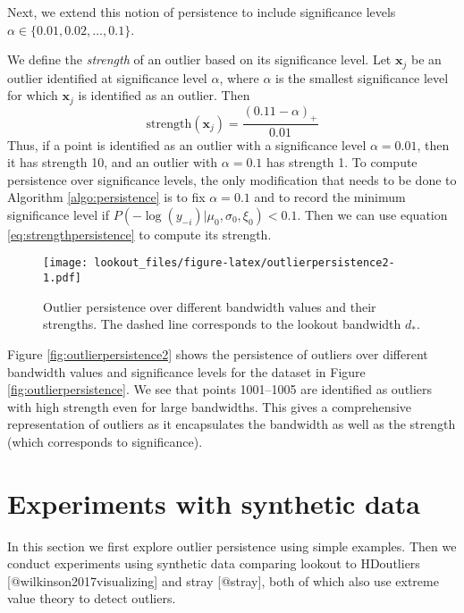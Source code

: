 \documentclass[
]{article}
\begin{document}
Next, we extend this notion of persistence to include significance
levels \(\alpha \in \{0.01, 0.02, \dots, 0.1 \}\).

We define the \emph{strength} of an outlier based on its significance
level. Let \(\bm{x}_j\) be an outlier identified at significance level
\(\alpha\), where \(\alpha\) is the smallest significance level for
which \(\bm{x}_j\) is identified as an outlier. Then
\begin{equation}\label{eq:strengthpersistence}
    \text{strength} (\bm{x}_j) = \frac{(0.11 - \alpha)_+}{0.01}
\end{equation} Thus, if a point is identified as an outlier with a
significance level \(\alpha = 0.01\), then it has strength 10, and an
outlier with \(\alpha = 0.1\) has strength 1. To compute persistence
over significance levels, the only modification that needs to be done to
Algorithm \ref{algo:persistence} is to fix \(\alpha = 0.1\) and to
record the minimum significance level if
\(P\left(-\log(y_{-i})|\mu_0, \sigma_0, \xi_0 \right) < 0.1\). Then we
can use equation \eqref{eq:strengthpersistence} to compute its strength.

\begin{figure}
\centering
\texttt{[image: lookout\_files/figure-latex/outlierpersistence2-1.pdf]}
\caption{Outlier persistence over different bandwidth values and their
strengths. The dashed line corresponds to the lookout bandwidth
\(d_*\).}
\end{figure}

Figure \ref{fig:outlierpersistence2} shows the persistence of outliers
over different bandwidth values and significance levels for the dataset
in Figure \ref{fig:outlierpersistence}. We see that points 1001--1005
are identified as outliers with high strength even for large bandwidths.
This gives a comprehensive representation of outliers as it encapsulates
the bandwidth as well as the strength (which corresponds to
significance).

\hypertarget{sec:simulations}{%
\section{Experiments with synthetic data}\label{sec:simulations}}

In this section we first explore outlier persistence using simple
examples. Then we conduct experiments using synthetic data comparing
lookout to HDoutliers {[}@wilkinson2017visualizing{]} and stray
{[}@stray{]}, both of which also use extreme value theory to detect
outliers.
\end{document}
